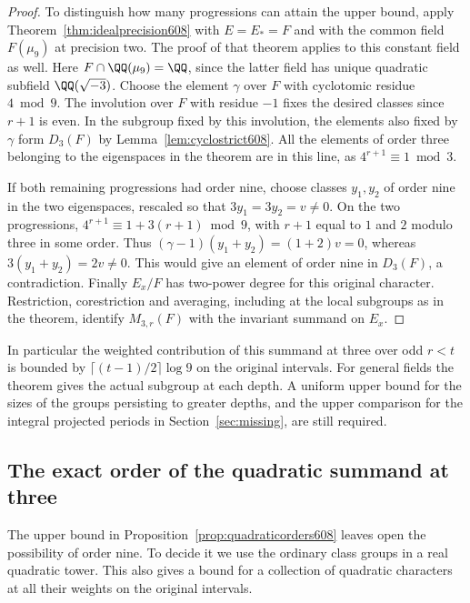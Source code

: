 \documentclass[a4paper,11pt]{article}
\theoremstyle{definition}
\theoremstyle{remark}
\numberwithin{equation}{section}
\begin{document}
\begin{proof}
To distinguish how many progressions can attain the upper bound,
apply Theorem~\ref{thm:idealprecision608} with \(E=E_*=F\)
and with the common field \(F(\mu_9)\) at precision two.
The proof of that theorem applies to this constant field as well.
Here \(F\cap\QQ(\mu_9)=\QQ\), since the latter field has unique
quadratic subfield \(\QQ(\sqrt{-3})\). Choose the element
\(\gamma\) over \(F\) with cyclotomic residue \(4\bmod9\).
The involution over \(F\) with residue \(-1\) fixes the desired
classes since \(r+1\) is even. In the subgroup fixed by this
involution, the elements also fixed by \(\gamma\) form \(D_3(F)\)
by Lemma~\ref{lem:cyclostrict608}. All the elements of order
three belonging to the eigenspaces in the theorem are in this
line, as \(4^{r+1}\equiv1\bmod3\).

If both remaining progressions had order nine, choose classes
\(y_1,y_2\) of order nine in the two eigenspaces, rescaled so
that \(3y_1=3y_2=v\ne0\). On the two progressions,
\(4^{r+1}\equiv1+3(r+1)\bmod9\), with \(r+1\) equal to
\(1\) and \(2\) modulo three in some order. Thus
\((\gamma-1)(y_1+y_2)=(1+2)v=0\), whereas
\(3(y_1+y_2)=2v\ne0\). This would give an element of order
nine in \(D_3(F)\), a contradiction. Finally \(E_x/F\) has
two-power degree for this original character. Restriction,
corestriction and averaging, including at the local subgroups
as in the theorem, identify \(M_{3,r}(F)\) with the invariant
summand on \(E_x\).
\end{proof}

In particular the weighted contribution of this summand at three
over odd \(r<t\) is bounded by \(\lceil(t-1)/2\rceil\log9\) on
the original intervals. For general fields the theorem gives
the actual subgroup at each depth. A uniform upper bound for the
sizes of the groups persisting to greater depths, and the upper
comparison for the integral projected periods in
Section~\ref{sec:missing}, are still required.


\subsection{The exact order of the quadratic summand at three}
\label{sec:quadraticexact609}

The upper bound in Proposition~\ref{prop:quadraticorders608} leaves
open the possibility of order nine. To decide it we use the
ordinary class groups in a real quadratic tower. This also gives
a bound for a collection of quadratic characters at all their
weights on the original intervals.
\end{document}
